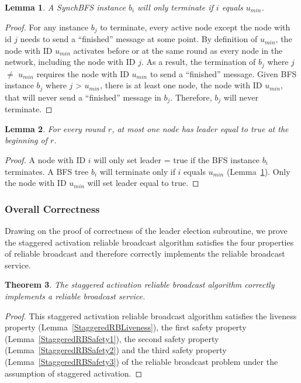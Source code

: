 \documentclass[english]{article}
\newtheorem{theorem}{Theorem}[section]
\newtheorem{lemma}[theorem]{Lemma}
\begin{document}
\begin{lemma}
\label{BFSTerminationStaggered}
  A SynchBFS instance $b_i$ will only terminate if $i$ equals $u_{min}$.
\end{lemma}
\begin{proof}
For any instance $b_j$ to terminate, every active node except the node with id $j$ needs to send a ``finished'' message at some point. By definition of $u_{min}$, the node with ID $u_{min}$ activates before or at the same round as every node in the network, including the node with ID $j$. As a result, the termination of $b_j$ where $j$ $\neq $ $u_{min}$ requires the node with ID $u_{min}$ to send a ``finished'' message. Given BFS instance $b_j$ where $j$ \textgreater $ $ $u_{min}$, there is at least one node, the node with ID $u_{min}$, that will never send a ``finished'' message in $b_j$. Therefore, $b_j$ will never terminate.
\end{proof}


\begin{lemma}
\label{LESafetyStaggered}
For every round $r$, at most one node has leader equal to true at the beginning of $r$.
\end{lemma}
\begin{proof}
A node with ID $i$ will only set leader = true if the BFS instance $b_i$ terminates.
A BFS tree $b_i$ will terminate only if $i$ equals $u_{min}$ (Lemma~\ref{BFSTerminationStaggered}).
Only the node with ID $u_{min}$ will set leader equal to true. 
\end{proof}


\subsubsection{Overall Correctness}

Drawing on the proof of correctness of the leader election subroutine, we prove the staggered activation reliable broadcast algorithm satisfies the four properties of reliable broadcast and therefore correctly implements the reliable broadcast service.

\begin{theorem}
\label{StaggeredReliableBroadcast}
The staggered activation reliable broadcast algorithm correctly implements a reliable broadcast service.
\end{theorem}
\begin{proof}
This staggered activation reliable broadcast algorithm satisfies the liveness property (Lemma~\ref{StaggeredRBLiveness}), 
the first safety property (Lemma~\ref{StaggeredRBSafety1}),
the second safety property (Lemma~\ref{StaggeredRBSafety2}) and 
the third safety property (Lemma~\ref{StaggeredRBSafety3}) of the reliable broadcast problem under the assumption of staggered activation.
\end{proof}
\end{document}
